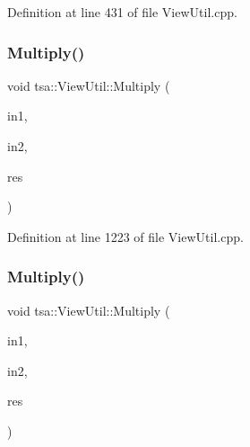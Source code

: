 Definition at line 431 of file View\+Util.\+cpp.

\mbox{\label{classtsa_1_1_view_util_ad9984dcf61bae9647aac60f0d3141d71}} 
\subsubsection{\texorpdfstring{Multiply()}{Multiply()}\hspace{0.1cm}{\footnotesize\ttfamily [1/3]}}
{\footnotesize\ttfamily void tsa\+::\+View\+Util\+::\+Multiply (\begin{DoxyParamCaption}\item[{\hyperlink{namespacetsa_ac599574bcc094eda25613724b8f3ca9e}{Seq\+View\+Double} \&}]{in1,  }\item[{\hyperlink{namespacetsa_ac599574bcc094eda25613724b8f3ca9e}{Seq\+View\+Double} \&}]{in2,  }\item[{\hyperlink{namespacetsa_ac599574bcc094eda25613724b8f3ca9e}{Seq\+View\+Double} \&}]{res }\end{DoxyParamCaption})\hspace{0.3cm}{\ttfamily [static]}}



Definition at line 1223 of file View\+Util.\+cpp.

\mbox{\label{classtsa_1_1_view_util_a3428ec74c858edbdea18d034f9afb761}} 
\subsubsection{\texorpdfstring{Multiply()}{Multiply()}\hspace{0.1cm}{\footnotesize\ttfamily [2/3]}}
{\footnotesize\ttfamily void tsa\+::\+View\+Util\+::\+Multiply (\begin{DoxyParamCaption}\item[{\hyperlink{namespacetsa_ac599574bcc094eda25613724b8f3ca9e}{Seq\+View\+Double} \&}]{in1,  }\item[{\hyperlink{namespacetsa_ab32775c889b53c40fa83939f22372b75}{Seq\+View\+Complex} \&}]{in2,  }\item[{\hyperlink{namespacetsa_ab32775c889b53c40fa83939f22372b75}{Seq\+View\+Complex} \&}]{res }\end{DoxyParamCaption})\hspace{0.3cm}{\ttfamily [static]}}



